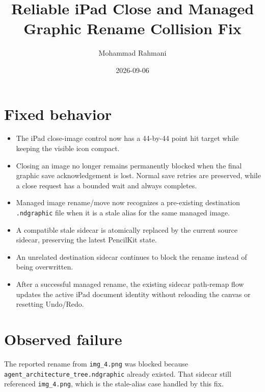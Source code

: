 \documentclass[a4paper]{article}
\title{Reliable iPad Close and Managed Graphic Rename Collision Fix}
\date{2026-09-06}
\author{Mohammad Rahmani}
\begin{document}
   \maketitle

   \section{Fixed behavior}

   \begin{itemize}
      \item The iPad close-image control now has a 44-by-44 point hit target while keeping the visible icon compact.
      \item Closing an image no longer remains permanently blocked when the final graphic save acknowledgement is lost. Normal save retries are preserved, while a close request has a bounded wait and always completes.
      \item Managed image rename/move now recognizes a pre-existing destination \texttt{.ndgraphic} file when it is a stale alias for the same managed image.
      \item A compatible stale sidecar is atomically replaced by the current source sidecar, preserving the latest PencilKit state.
      \item An unrelated destination sidecar continues to block the rename instead of being overwritten.
      \item After a successful managed rename, the existing sidecar path-remap flow updates the active iPad document identity without reloading the canvas or resetting Undo/Redo.
   \end{itemize}

   \section{Observed failure}

   The reported rename from \texttt{img\_4.png} was blocked because
   \texttt{agent\_architecture\_tree.ndgraphic} already existed. That sidecar
   still referenced \texttt{img\_4.png}, which is the stale-alias case handled
   by this fix.

   
   
\end{document}
